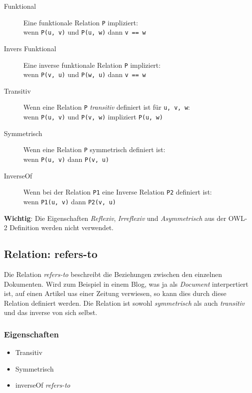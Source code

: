 \documentclass[
    11pt,
    latin1,
    a4paper,
    oneside
]{scrreprt}
\begin{document}
\begin{description}
	\item[Funktional] Eine funktionale Relation \texttt{P} impliziert: \\
		wenn \texttt{P(u, v)} und \texttt{P(u, w)} dann \texttt{v == w}
	\item[Invers Funktional] Eine inverse funktionale Relation \texttt{P} impliziert: \\
		wenn \texttt{P(v, u)} und \texttt{P(w, u)} dann \texttt{v == w}
	\item[Transitiv] Wenn eine Relation \texttt{P} \emph{transitiv} definiert ist f\"ur \texttt{u, v, w}: \\
		wenn \texttt{P(u, v)} und \texttt{P(v, w)} impliziert \texttt{P(u, w)}
	\item[Symmetrisch] Wenn eine Relation \texttt{P} symmetrisch definiert ist: \\
		wenn \texttt{P(u, v)} dann \texttt{P(v, u)}
	\item[InverseOf] Wenn bei der Relation \texttt{P1} eine Inverse Relation \texttt{P2} definiert ist:\\
		wenn \texttt{P1(u, v)} dann \texttt{P2(v, u)}
\end{description}

\textbf{Wichtig}: Die Eigenschaften \emph{Reflexiv}, \emph{Irreflexiv} und \emph{Asymmetrisch} aus der OWL-2 Definition werden nicht verwendet.


\subsection{Relation: refers-to} \label{sec:rel_refersto}

Die Relation \emph{refers-to} beschreibt die Beziehungen zwischen den einzelnen Dokumenten. Wird zum Beispiel in einem Blog, was ja als \emph{Document} interpertiert ist, auf einen Artikel uas einer Zeitung verwiesen, so kann dies durch diese Relation definiert werden. Die Relation ist sowohl \emph{symmetrisch} als auch \emph{transitiv} und das inverse von sich selbst.

\subsubsection{Eigenschaften} \label{sec:rel_refersto_settings}

\begin{itemize}
	\item Transitiv
	\item Symmetrisch
	\item inverseOf \emph{refers-to}
\end{itemize}
\end{document}
